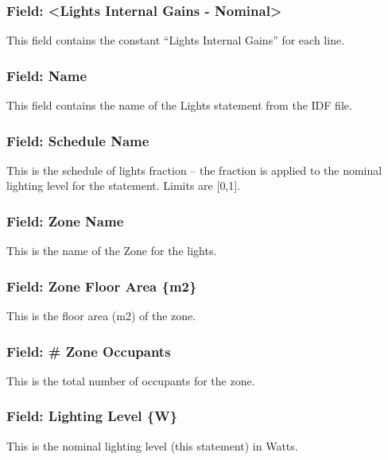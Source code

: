 \subsubsection{Field: \textless{}Lights Internal Gains - Nominal\textgreater{}}\label{field-lights-internal-gains---nominal}

This field contains the constant ``Lights Internal Gains'' for each line.

\subsubsection{Field: Name}\label{field-name-2}

This field contains the name of the Lights statement from the IDF file.

\subsubsection{Field: Schedule Name}\label{field-schedule-name-1}

This is the schedule of lights fraction -- the fraction is applied to the nominal lighting level for the statement. Limits are {[}0,1{]}.

\subsubsection{Field: Zone Name}\label{field-zone-name-3}

This is the name of the Zone for the lights.

\subsubsection{Field: Zone Floor Area \{m2\}}\label{field-zone-floor-area-m2-1}

This is the floor area (m2) of the zone.

\subsubsection{Field: \# Zone Occupants}\label{field-zone-occupants-1}

This is the total number of occupants for the zone.

\subsubsection{Field: Lighting Level \{W\}}\label{field-lighting-level-w}

This is the nominal lighting level (this statement) in Watts.


